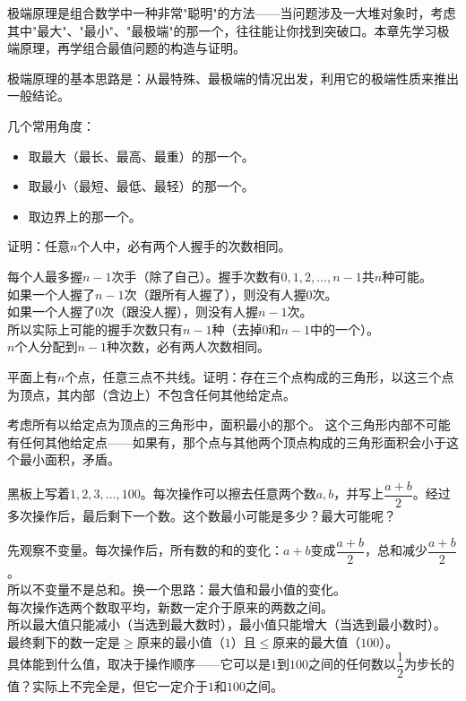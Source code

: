 
极端原理是组合数学中一种非常"聪明"的方法——当问题涉及一大堆对象时，考虑其中"最大"、"最小"、"最极端"的那一个，往往能让你找到突破口。本章先学习极端原理，再学组合最值问题的构造与证明。


极端原理的基本思路是：从最特殊、最极端的情况出发，利用它的极端性质来推出一般结论。

几个常用角度：
\begin{itemize}
\item 取最大（最长、最高、最重）的那一个。
\item 取最小（最短、最低、最轻）的那一个。
\item 取边界上的那一个。
\end{itemize}

\begin{example}
证明：任意$n$个人中，必有两个人握手的次数相同。
\end{example}
\begin{solution}
每个人最多握$n-1$次手（除了自己）。握手次数有$0,1,2,\dots,n-1$共$n$种可能。\\
如果一个人握了$n-1$次（跟所有人握了），则没有人握$0$次。\\
如果一个人握了$0$次（跟没人握），则没有人握$n-1$次。\\
所以实际上可能的握手次数只有$n-1$种（去掉$0$和$n-1$中的一个）。\\
$n$个人分配到$n-1$种次数，必有两人次数相同。
\end{solution}

\begin{example}
平面上有$n$个点，任意三点不共线。证明：存在三个点构成的三角形，以这三个点为顶点，其内部（含边上）不包含任何其他给定点。
\end{example}
\begin{solution}
考虑所有以给定点为顶点的三角形中，面积最小的那个。
这个三角形内部不可能有任何其他给定点——如果有，那个点与其他两个顶点构成的三角形面积会小于这个最小面积，矛盾。
\end{solution}

\begin{example}
黑板上写着$1,2,3,\dots,100$。每次操作可以擦去任意两个数$a,b$，并写上$\dfrac{a+b}{2}$。经过多次操作后，最后剩下一个数。这个数最小可能是多少？最大可能呢？
\end{example}
\begin{solution}
先观察不变量。每次操作后，所有数的和的变化：$a+b$变成$\dfrac{a+b}{2}$，总和减少$\dfrac{a+b}{2}$。\\
所以不变量不是总和。换一个思路：最大值和最小值的变化。\\
每次操作选两个数取平均，新数一定介于原来的两数之间。\\
所以最大值只能减小（当选到最大数时），最小值只能增大（当选到最小数时）。\\
最终剩下的数一定是$\ge$原来的最小值（$1$）且$\le$原来的最大值（$100$）。\\
具体能到什么值，取决于操作顺序——它可以是$1$到$100$之间的任何数以$\dfrac12$为步长的值？实际上不完全是，但它一定介于$1$和$100$之间。
\end{solution}

